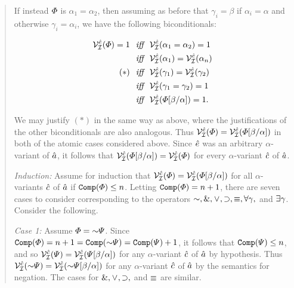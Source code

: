 \begin{quote}
  If instead $\varPhi$ is $\alpha_1=\alpha_2$, then assuming as before that $\gamma_i=\beta$ if $\alpha_i=\alpha$ and otherwise $\gamma_i=\alpha_i$, we have the following biconditionals:

  \vspace{-.2in}
  \begin{align*}
    \mathcal{V}_{\mathcal{I}}^{\hat{e}}(\varPhi)=1 &\textit{ ~iff~ } \mathcal{V}_{\mathcal{I}}^{\hat{e}}(\alpha_1=\alpha_2)=1\\
      &\textit{ ~iff~ } \mathcal{V}_{\mathcal{I}}^{\hat{e}}(\alpha_1)=\mathcal{V}_{\mathcal{I}}^{\hat{e}}(\alpha_n)\\
      (\ast) &\textit{ ~iff~ } \mathcal{V}_{\mathcal{I}}^{\hat{e}}(\gamma_1)=\mathcal{V}_{\mathcal{I}}^{\hat{e}}(\gamma_2)\\
      &\textit{ ~iff~ } \mathcal{V}_{\mathcal{I}}^{\hat{e}}(\gamma_1=\gamma_2)=1\\
      &\textit{ ~iff~ } \mathcal{V}_{\mathcal{I}}^{\hat{e}}(\varPhi[\beta/\alpha])=1.
  \end{align*}

  We may justify $(\ast)$ in the same way as above, where the justifications of the other biconditionals are also analogous. 
  Thus $\mathcal{V}_{\mathcal{I}}^{\hat{e}}(\varPhi)=\mathcal{V}_{\mathcal{I}}^{\hat{e}}(\varPhi[\beta/\alpha])$ in both of the atomic cases considered above. 
  Since $\hat{e}$ was an arbitrary $\alpha$-variant of $\hat{a}$, it follows that $\mathcal{V}_{\mathcal{I}}^{\hat{c}}(\varPhi[\beta/\alpha])=\mathcal{V}_{\mathcal{I}}^{\hat{c}}(\varPhi)$ for every $\alpha$-variant $\hat{c}$ of $\hat{a}$.

  \textit{Induction:} Assume for induction that $\mathcal{V}_{\mathcal{I}}^{\hat{c}}(\varPhi)=\mathcal{V}_{\mathcal{I}}^{\hat{c}}(\varPhi[\beta/\alpha])$ for all $\alpha$-variants $\hat{c}$ of $\hat{a}$ if $\texttt{Comp}(\varPhi)\leq n$. 
  Letting $\texttt{Comp}(\varPhi)=n+1$, there are seven cases to consider corresponding to the operators $\enot,\eand,\eor,\eif,\eiff,\qt{\forall}{\gamma},$ and $\exists \gamma$.
  Consider the following.

  \textit{Case 1:} Assume $\metaA=\enot\metaB$.
  Since $\comp(\metaA)=n+1=\comp(\enot\metaB)=\comp(\metaB)+1$, it follows that $\texttt{Comp}(\varPsi)\leq n$, and so $\mathcal{V}_{\mathcal{I}}^{\hat{c}}(\varPsi)=\mathcal{V}_{\mathcal{I}}^{\hat{c}}(\varPsi[\beta/\alpha])$ for any $\alpha$-variant $\hat{c}$ of $\hat{a}$ by hypothesis.
  Thus $\VV{\I}{\va{c}}(\enot\metaB)=\VV{\I}{\va{c}}(\enot\metaB\unisub{\beta}{\alpha})$ for any $\alpha$-variant $\hat{c}$ of $\hat{a}$ by the semantics for negation.
  The cases for $\mathrel\&,\mkern1mu\vee\mkern1mu,\supset,$ and $\equiv$ are similar.


\end{quote}
